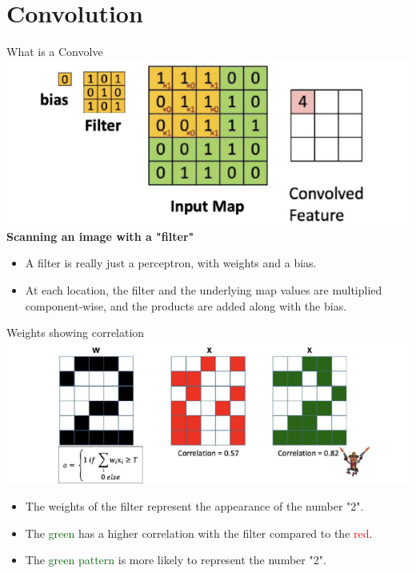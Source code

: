 \documentclass[serif, aspectratio=169]{beamer}
\begin{document}
	
	\section{Convolution}
	\begin{frame}{What is a Convolve}
		\centering
		\includegraphics[keepaspectratio, scale=0.9]{pic/convo.png}
		\\
		\textbf{Scanning an image with a "filter"}
		
		\begin{itemize}
			\item A filter is really just a perceptron, with weights and a bias.
			\item At each location, the filter and the underlying map values are multiplied component-wise, and the products are added along with the bias.
		\end{itemize}
		
	\end{frame}
	\begin{frame}{Weights showing correlation}
		\centering
		\includegraphics[keepaspectratio, scale=0.9]{pic/corr.png}
		\begin{itemize}
			\item The weights of the filter represent the appearance of the number "2".
			\item The \textcolor{darkgreen}{green} has a higher correlation with the filter compared to the \textcolor{red}{red}.
			\item The \textcolor{darkgreen}{green pattern} is more likely to represent the number "2".
		\end{itemize}
	\end{frame}
\end{document}
